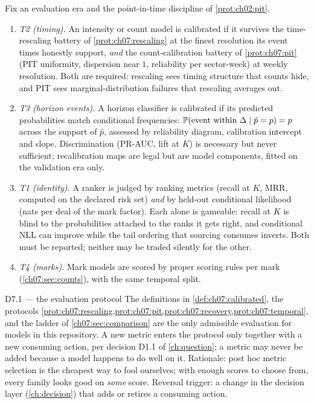 \begin{definition}\label{def:ch07:calibrated}
Fix an evaluation era and the point-in-time discipline of
\cref{prot:ch02:pit}.
\begin{enumerate}[label=(\roman*)]
\item \emph{T2 (timing).} An intensity or count model is calibrated if it
survives the time-rescaling battery of \cref{prot:ch07:rescaling} at the
finest resolution its event times honestly support, \emph{and} the
count-calibration battery of \cref{prot:ch07:pit} (PIT uniformity,
dispersion near $1$, reliability per sector-week) at weekly resolution.
Both are required: rescaling sees timing structure that counts hide, and
PIT sees marginal-distribution failures that rescaling averages out.
\item \emph{T3 (horizon events).} A horizon classifier is calibrated if its
predicted probabilities match conditional frequencies:
$\mathbb{P}(\text{event within } \Delta \mid \hat p = p) = p$ across the
support of $\hat p$, assessed by reliability diagram, calibration
intercept and slope. Discrimination (PR-AUC, lift at $K$) is necessary
but never sufficient; recalibration maps
\citep{platt1999,zadroznyelkan2002,niculescumizil2005} are legal but are
model components, fitted on the validation era only.
\item \emph{T1 (identity).} A ranker is judged by ranking metrics
(recall at $K$, MRR, computed on the declared risk set) \emph{and} by
held-out conditional likelihood (nats per deal of the mark factor). Each
alone is gameable: recall at $K$ is blind to the probabilities attached to
the ranks it gets right, and conditional NLL can improve while the tail
ordering that sourcing consumes inverts. Both must be reported; neither
may be traded silently for the other.
\item \emph{T4 (marks).} Mark models are scored by proper scoring rules per
mark (\cref{ch07:sec:counts}), with the same temporal split.
\end{enumerate}
\end{definition}

\begin{decision}{D7.1 --- the evaluation protocol}
The definitions in \cref{def:ch07:calibrated}, the protocols
\cref{prot:ch07:rescaling,prot:ch07:pit,prot:ch07:recovery,prot:ch07:temporal},
and the ladder of \cref{ch07:sec:comparison} are the only admissible
evaluation for models in this repository. A new metric enters the
protocol only together with a new consuming action, per decision D1.1
of \cref{ch:question}; a metric may never be added because a model
happens to do well on it. Rationale: post hoc metric selection is the
cheapest way to fool ourselves; with enough scores to choose from, every
family looks good on \emph{some} score. Reversal trigger: a change
in the decision layer (\cref{ch:decision}) that adds or retires a
consuming action.
\end{decision}

